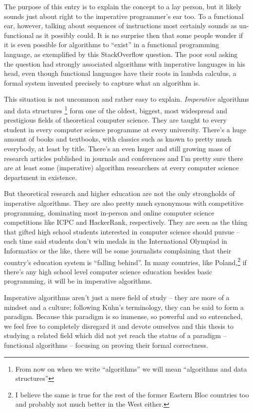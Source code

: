 \documentclass[declaration,mgr,english,shortabstract]{iithesis}
\begin{document}
The purpose of this entry is to explain the concept to a lay person, but it likely sounds just about right to the imperative programmer's ear too. To a functional ear, however, talking about sequences of instructions most certainly sounds as un-functional as it possibly could. It is no surprise then that some people wonder if it is even possible for algorithms to ``exist'' in a functional programming language, as exemplified by this \cite{SO} StackOverflow question. The poor soul asking the question had strongly associated algorithms with imperative languages in his head, even though functional languages have their roots in lambda calculus, a formal system invented precisely to capture what an algorithm is.

This situation is not uncommon and rather easy to explain. \textit{Imperative} algorithms and data structures \footnote{From now on when we write ``algorithms'' we will mean ``algorithms and data structures''} form one of the oldest, biggest, most widespread and prestigious fields of theoretical computer science. They are taught to every student in every computer science programme at every university. There's a huge amount of books and textbooks, with classics such as \cite{CLRS} \cite{TAOCP} known to pretty much everybody, at least by title. There's an even huger and still growing mass of research articles published in journals and conferences and I'm pretty sure there are at least some (imperative) algorithm researchers at every computer science department in existence.

But theoretical research and higher education are not the only strongholds of imperative algorithms. They are also pretty much synonymous with competitive programming, dominating most in-person and online computer science competitions like ICPC and HackerRank, respectively. They are seen as the thing that gifted high school students interested in computer science should pursue -- each time said students don't win medals in the International Olympiad in Informatics or the like, there will be some journalists complaining that their country's education system is ``falling behind''. In many countries, like Poland,\footnote{I believe the same is true for the rest of the former Eastern Bloc countries too and probably not much better in the West either.} if there's any high school level computer science education besides basic programming, it will be in imperative algorithms.

Imperative algorithms aren't just a mere field of study -- they are more of a mindset and a culture; following Kuhn's \cite{Kuhn} terminology, they can be said to form a paradigm. Because this paradigm is so immense, so powerful and so entrenched, we feel free to completely disregard it and devote ourselves and this thesis to studying a related field which did not yet reach the status of a paradigm -- functional algorithms -- focusing on proving their formal correctness.
\end{document}
